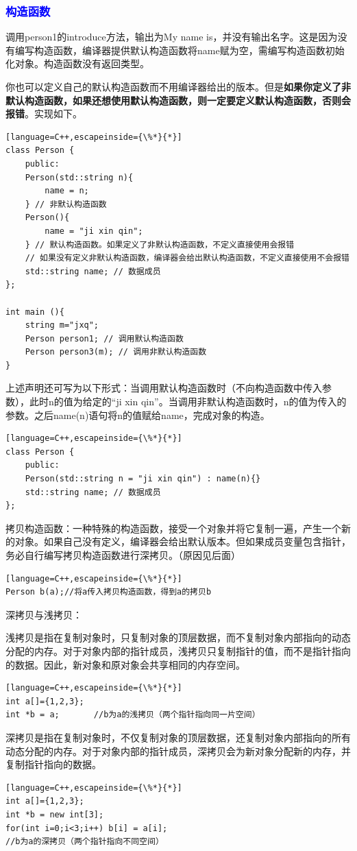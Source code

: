 \documentclass[UTF8]{ctexart}
\begin{document}
\subsubsection{\textcolor{blue}{构造函数}}
调用person1的introduce方法，输出为My name is，并没有输出名字。这是因为没有编写构造函数，编译器提供默认构造函数将name赋为空，需编写构造函数初始化对象。构造函数没有返回类型。

你也可以定义自己的默认构造函数而不用编译器给出的版本。但是\textbf{如果你定义了非默认构造函数，如果还想使用默认构造函数，则一定要定义默认构造函数，否则会报错}。实现如下。
\begin{lstlisting}[language=C++,escapeinside={\%*}{*}]
class Person {
	public:
	Person(std::string n){
		name = n;
	} // 非默认构造函数
	Person(){
		name = "ji xin qin";
	} // 默认构造函数。如果定义了非默认构造函数，不定义直接使用会报错
	// 如果没有定义非默认构造函数，编译器会给出默认构造函数，不定义直接使用不会报错
	std::string name; // 数据成员
};

int main (){
	string m="jxq";
	Person person1; // 调用默认构造函数
	Person person3(m); // 调用非默认构造函数
}
\end{lstlisting}
上述声明还可写为以下形式：当调用默认构造函数时（不向构造函数中传入参数），此时n的值为给定的“ji xin qin”。当调用非默认构造函数时，n的值为传入的参数。之后name(n)语句将n的值赋给name，完成对象的构造。
\begin{lstlisting}[language=C++,escapeinside={\%*}{*}]
class Person {
	public:
	Person(std::string n = "ji xin qin") : name(n){}
	std::string name; // 数据成员
};
\end{lstlisting}
拷贝构造函数：一种特殊的构造函数，接受一个对象并将它复制一遍，产生一个新的对象。如果自己没有定义，编译器会给出默认版本。但如果成员变量包含指针，务必自行编写拷贝构造函数进行深拷贝。（原因见后面）
\begin{lstlisting}[language=C++,escapeinside={\%*}{*}]
Person b(a);//将a传入拷贝构造函数，得到a的拷贝b
\end{lstlisting}
深拷贝与浅拷贝：

浅拷贝是指在复制对象时，只复制对象的顶层数据，而不复制对象内部指向的动态分配的内存。对于对象内部的指针成员，浅拷贝只复制指针的值，而不是指针指向的数据。因此，新对象和原对象会共享相同的内存空间。
\begin{lstlisting}[language=C++,escapeinside={\%*}{*}]
int a[]={1,2,3};
int *b = a;       //b为a的浅拷贝（两个指针指向同一片空间）
\end{lstlisting}
深拷贝是指在复制对象时，不仅复制对象的顶层数据，还复制对象内部指向的所有动态分配的内存。对于对象内部的指针成员，深拷贝会为新对象分配新的内存，并复制指针指向的数据。
\begin{lstlisting}[language=C++,escapeinside={\%*}{*}]
int a[]={1,2,3};
int *b = new int[3];       
for(int i=0;i<3;i++) b[i] = a[i];
//b为a的深拷贝（两个指针指向不同空间）
\end{lstlisting}
\end{document}

